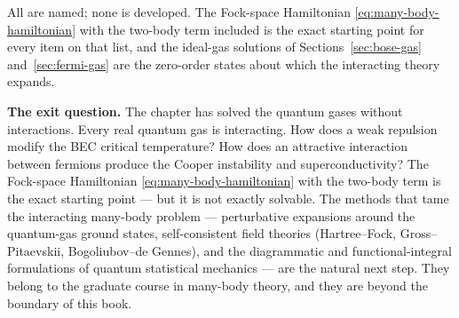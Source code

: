 All are named; none is developed. The Fock-space Hamiltonian \eqref{eq:many-body-hamiltonian} with the two-body term included is the exact starting point for every item on that list, and the ideal-gas solutions of Sections~\ref{sec:bose-gas} and~\ref{sec:fermi-gas} are the zero-order states about which the interacting theory expands.

\medskip\noindent\textbf{The exit question.}
The chapter has solved the quantum gases without interactions. Every real quantum gas is interacting. How does a weak repulsion modify the BEC critical temperature? How does an attractive interaction between fermions produce the Cooper instability and superconductivity? The Fock-space Hamiltonian \eqref{eq:many-body-hamiltonian} with the two-body term is the exact starting point --- but it is not exactly solvable. The methods that tame the interacting many-body problem --- perturbative expansions around the quantum-gas ground states, self-consistent field theories (Hartree--Fock, Gross--Pitaevskii, Bogoliubov--de Gennes), and the diagrammatic and functional-integral formulations of quantum statistical mechanics --- are the natural next step. They belong to the graduate course in many-body theory, and they are beyond the boundary of this book.

